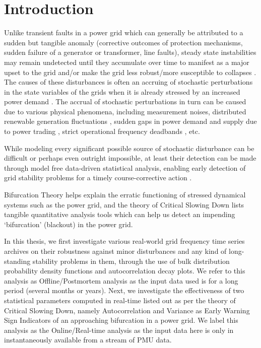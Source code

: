 \section[Introduction]{Introduction}
\label{sec:intro}

Unlike transient faults in a power grid which can generally be attributed to a sudden but tangible anomaly (corrective outcomes of protection mechanisms, sudden failure of a generator or transformer, line faults), steady state instabilities may remain undetected until they accumulate over time to manifest as a major upset to the grid \cite{entsoeReportGridCollapseContinentalEurope2021Jan} and/or make the grid less robust/more susceptible to collapses \cite{schafer01}. The causes of these disturbances is often an accruing of stochastic perturbations in the state variables of the grids when it is already stressed by an increased power demand \cite{rosehartBifurcationAnalysisOfVariousPowerSystemModels}.  The accrual of stochastic perturbations in turn can be caused due to various physical phenomena, including measurement noises, distributed renewable generation fluctuations \cite{adeen01}, sudden gaps in power demand and supply due to power trading \cite{schafer01}, strict operational frequency deadbands \cite{vorobev01, francesca01}, etc.
 
While modeling every significant possible source of stochastic disturbance can be difficult or perhaps even outright impossible, at least their detection can be made through model free data-driven statistical analysis, enabling early detection of grid stability problems for a timely course-corrective action \cite{schafer01, sanchez01, ghanvati01}.

Bifurcation Theory \cite{rosehartBifurcationAnalysisOfVariousPowerSystemModels, chenBifurcationsAndChaosInEngineering, mohlerDyanmicsAndControlPartOne, nathanKutzNotesOnBifurcationTheoryAndNormalForms} helps explain the erratic functioning of stressed dynamical systems such as the power grid, and the theory of Critical Slowing Down \cite{schefferEarlyWarningSignalsForCriticalTransitions} lists tangible quantitative analysis tools which can help us detect an impending `bifurcation' (blackout) in the power grid.

In this thesis, we first investigate various real-world grid frequency time series archives on their robustness against minor disturbances and any kind of long-standing stability problems in them, through the use of bulk distribution probability density functions and autocorrelation decay plots. We refer to this analysis as Offline/Postmortem analysis as the input data used is for a long period (several months or years). Next, we investigate the effectiveness of two statistical parameters computed in real-time listed out as per the theory of Critical Slowing Down, namely Autocorrelation and Variance as Early Warning Sign Indicators of an approaching bifurcation in a power grid. We label this analysis as the Online/Real-time analysis as the input data here is only in instantaneously available from a stream of PMU data.
